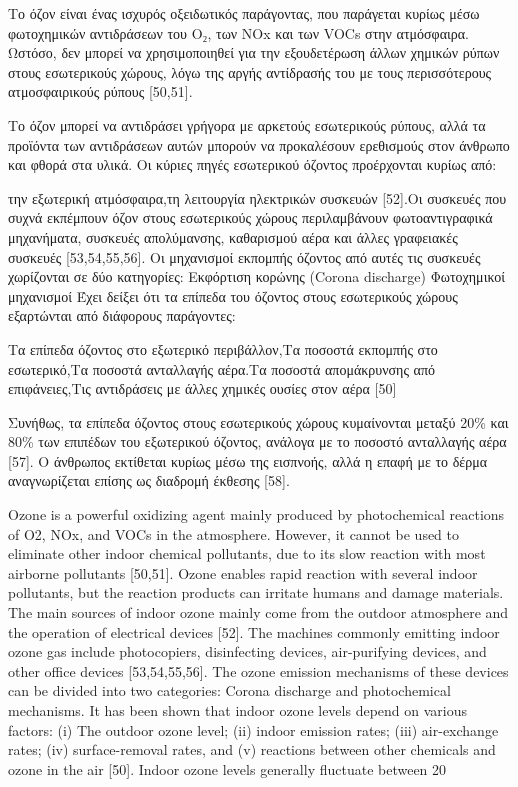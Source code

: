 Το όζον είναι ένας ισχυρός οξειδωτικός παράγοντας, που παράγεται κυρίως μέσω φωτοχημικών αντιδράσεων του O₂, των NOx και των VOCs στην ατμόσφαιρα. Ωστόσο, δεν μπορεί να χρησιμοποιηθεί για την εξουδετέρωση άλλων χημικών ρύπων στους εσωτερικούς χώρους, λόγω της αργής αντίδρασής του με τους περισσότερους ατμοσφαιρικούς ρύπους [50,51].

Το όζον μπορεί να αντιδράσει γρήγορα με αρκετούς εσωτερικούς ρύπους, αλλά τα προϊόντα των αντιδράσεων αυτών μπορούν να προκαλέσουν ερεθισμούς στον άνθρωπο και φθορά στα υλικά. Οι κύριες πηγές εσωτερικού όζοντος προέρχονται κυρίως από:

την εξωτερική ατμόσφαιρα,τη λειτουργία ηλεκτρικών συσκευών [52].Οι συσκευές που συχνά εκπέμπουν όζον στους εσωτερικούς χώρους περιλαμβάνουν φωτοαντιγραφικά μηχανήματα, συσκευές απολύμανσης, καθαρισμού αέρα και άλλες γραφειακές συσκευές [53,54,55,56]. Οι μηχανισμοί εκπομπής όζοντος από αυτές τις συσκευές χωρίζονται σε δύο κατηγορίες:
Εκφόρτιση κορώνης (Corona discharge) Φωτοχημικοί μηχανισμοί
Έχει δείξει ότι τα επίπεδα του όζοντος στους εσωτερικούς χώρους εξαρτώνται από διάφορους παράγοντες:

Τα επίπεδα όζοντος στο εξωτερικό περιβάλλον,Τα ποσοστά εκπομπής στο εσωτερικό,Τα ποσοστά ανταλλαγής αέρα.Τα ποσοστά απομάκρυνσης από επιφάνειες,Τις αντιδράσεις με άλλες χημικές ουσίες στον αέρα [50]

Συνήθως, τα επίπεδα όζοντος στους εσωτερικούς χώρους κυμαίνονται μεταξύ 20\% και 80\% των επιπέδων του εξωτερικού όζοντος, ανάλογα με το ποσοστό ανταλλαγής αέρα [57]. Ο άνθρωπος εκτίθεται κυρίως μέσω της εισπνοής, αλλά η επαφή με το δέρμα αναγνωρίζεται επίσης ως διαδρομή έκθεσης [58].

Ozone is a powerful oxidizing agent mainly produced by photochemical reactions of O2, NOx, and VOCs in the atmosphere. However, it cannot be used to eliminate other indoor chemical pollutants, due to its slow reaction with most airborne pollutants [50,51]. Ozone enables rapid reaction with several indoor pollutants, but the reaction products can irritate humans and damage materials. The main sources of indoor ozone mainly come from the outdoor atmosphere and the operation of electrical devices [52]. The machines commonly emitting indoor ozone gas include photocopiers, disinfecting devices, air-purifying devices, and other office devices [53,54,55,56]. The ozone emission mechanisms of these devices can be divided into two categories: Corona discharge and photochemical mechanisms. It has been shown that indoor ozone levels depend on various factors: (i) The outdoor ozone level; (ii) indoor emission rates; (iii) air-exchange rates; (iv) surface-removal rates, and (v) reactions between other chemicals and ozone in the air [50]. Indoor ozone levels generally fluctuate between 20%
\cite{ijerph17238972}

